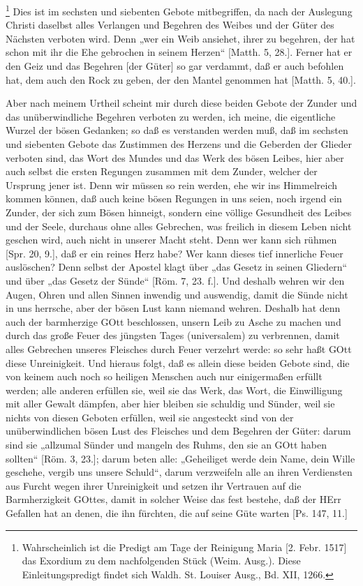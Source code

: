 \footnote{Wahrscheinlich ist die Predigt am Tage der Reinigung Maria [2. Febr. 1517] das Exordium zu dem nachfolgenden Stück (Weim. Ausg.). Diese Einleitungspredigt findet sich Waldh. St. Louiser Ausg., Bd. XII, 1266.} Dies ist im sechsten und siebenten Gebote mitbegriffen, da nach der Auslegung Christi daselbst alles Verlangen und Begehren des Weibes und der Güter des Nächsten verboten wird. Denn „wer ein Weib ansiehet, ihrer zu begehren, der hat schon mit ihr die Ehe gebrochen in seinem Herzen“ [Matth. 5, 28.]. Ferner hat er den Geiz und das Begehren [der Güter] so gar verdammt, daß er auch befohlen hat, dem auch den Rock zu geben, der den Mantel genommen hat [Matth. 5, 40.].

Aber nach meinem Urtheil scheint mir durch diese beiden Gebote der Zunder und das unüberwindliche Begehren verboten zu werden, ich meine, die eigentliche Wurzel der bösen Gedanken; so daß es verstanden werden muß, daß im sechsten und siebenten Gebote das Zustimmen des Herzens und die Geberden der Glieder verboten sind, das Wort des Mundes und das Werk des bösen Leibes, hier aber auch selbst die ersten Regungen zusammen mit dem Zunder, welcher der Ursprung jener ist. Denn wir müssen so rein werden, ehe wir ins Himmelreich kommen können, daß auch keine bösen Regungen in uns seien, noch irgend ein Zunder, der sich zum Bösen hinneigt, sondern eine völlige Gesundheit des Leibes und der Seele, durchaus ohne alles Gebrechen, was freilich in diesem Leben nicht geschen
wird, auch nicht in unserer Macht steht. Denn wer kann sich rühmen [Spr. 20, 9.], daß er ein reines Herz habe? Wer kann dieses tief innerliche Feuer auslöschen? Denn selbst der Apostel klagt über „das Gesetz in seinen Gliedern“ und über „das Gesetz der Sünde“ [Röm. 7, 23. f.]. Und deshalb wehren wir den Augen, Ohren und allen Sinnen inwendig und auswendig, damit die Sünde nicht in uns herrsche, aber der bösen Lust kann niemand wehren. Deshalb hat denn auch der barmherzige GOtt beschlossen, unsern Leib zu Asche zu machen und durch das große Feuer des jüngsten Tages (universalem) zu verbrennen, damit alles Gebrechen unseres Fleisches durch Feuer verzehrt werde: so sehr haßt GOtt diese Unreinigkeit. Und hieraus folgt, daß es allein diese beiden Gebote sind, die von keinem auch noch so heiligen Menschen auch nur einigermaßen erfüllt werden; alle anderen erfüllen sie, weil sie das Werk, das Wort, die Einwilligung mit aller Gewalt dämpfen, aber hier bleiben sie schuldig und Sünder, weil sie nichts von diesen Geboten erfüllen, weil sie angesteckt sind von der unüberwindlichen bösen Lust des Fleisches und dem Begehren der Güter: darum sind sie „allzumal Sünder und mangeln des Ruhms, den sie an GOtt haben sollten“ [Röm. 3, 23.]; darum beten alle: „Geheiliget werde dein Name, dein Wille geschehe, vergib uns unsere Schuld“, darum verzweifeln alle an ihren Verdiensten aus Furcht wegen ihrer Unreinigkeit und setzen ihr Vertrauen auf die Barmherzigkeit GOttes, damit in solcher Weise das fest bestehe, daß der HErr Gefallen hat an denen, die ihn fürchten, die auf seine Güte warten [Ps. 147, 11.]


